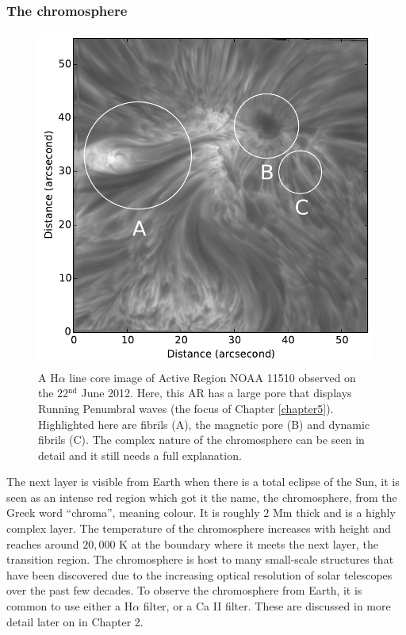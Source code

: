 \subsubsection{The chromosphere}
\label{chromo}

    \begin{figure}
        \centering
        \includegraphics[width=\textwidth]{Chromo.pdf}
        \caption{
                 A H$\alpha$ line core image of Active Region NOAA 11510 observed on the 22$^{\mathrm{nd}}$ June 2012.
                 Here, this AR has a large pore that displays Running Penumbral waves (the focus of Chapter \ref{chapter5}).
                 Highlighted here are fibrils (A), the magnetic pore (B) and dynamic fibrils (C).
                 The complex nature of the chromosphere can be seen in detail and it still needs a full explanation.
                }
        \label{fig:chromosphere}
    \end{figure}   

    The next layer is visible from Earth when there is a total eclipse of the Sun, it is seen as an intense red region which got it the name, the chromosphere, from the Greek word ``chroma'', meaning colour.
    It is roughly $2$ Mm thick and is a highly complex layer.
    The temperature of the chromosphere increases with height and reaches around $20,000$ K at the boundary where it meets the next layer, the transition region.    
    The chromosphere is host to many small-scale structures that have been discovered due to the increasing optical resolution of solar telescopes over the past few decades.
    To observe the chromosphere from Earth, it is common to use either a H$\alpha$ filter, or a Ca II filter. 
    These are discussed in more detail later on in Chapter 2. 
        
